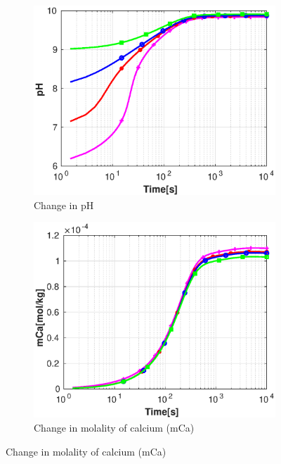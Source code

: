\begin{figure}[!h]
        \centering
    \begin{subfigure}{.5\linewidth}
            \centering
        \includegraphics[width=\textwidth]{PICTURES/without_pH_pH.eps}
        \caption{Change in pH}
        \label{fig:withoutpHpH}
    \end{subfigure}%
        \hfill
    \begin{subfigure}{.5\linewidth}
            \centering
        \includegraphics[width=\textwidth]{PICTURES/without_pH_mCa.eps}
        \caption{Change in molality of calcium (mCa)}
        \label{fig:withoutpHmCa}

\end{subfigure}
\end{figure}

